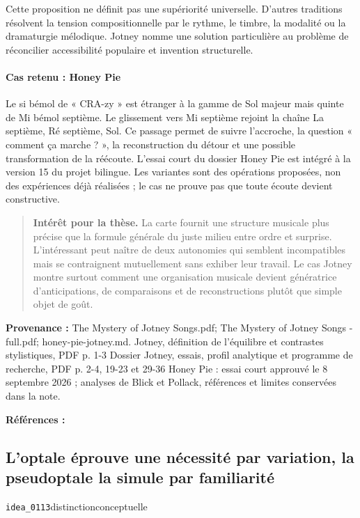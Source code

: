 \documentclass[10pt,a4paper]{article}
\begin{document}
Cette proposition ne définit pas une supériorité universelle. D'autres traditions résolvent la tension compositionnelle par le rythme, le timbre, la modalité ou la dramaturgie mélodique. Jotney nomme une solution particulière au problème de réconcilier accessibilité populaire et invention structurelle.

\paragraph{Cas retenu : Honey Pie}
Le si bémol de « CRA-zy » est étranger à la gamme de Sol majeur mais quinte de Mi bémol septième. Le glissement vers Mi septième rejoint la chaîne La septième, Ré septième, Sol. Ce passage permet de suivre l'accroche, la question « comment ça marche ? », la reconstruction du détour et une possible transformation de la réécoute. L'essai court du dossier Honey Pie est intégré à la version 15 du projet bilingue. Les variantes sont des opérations proposées, non des expériences déjà réalisées ; le cas ne prouve pas que toute écoute devient constructive.

\begin{quote}
\textbf{Intérêt pour la thèse.} La carte fournit une structure musicale plus précise que la formule générale du juste milieu entre ordre et surprise. L'intéressant peut naître de deux autonomies qui semblent incompatibles mais se contraignent mutuellement sans exhiber leur travail. Le cas Jotney montre surtout comment une organisation musicale devient génératrice d'anticipations, de comparaisons et de reconstructions plutôt que simple objet de goût.
\end{quote}
{\footnotesize\color{metadata}\textbf{Provenance :} The Mystery of Jotney Songs.pdf; The Mystery of Jotney Songs -full.pdf; honey-pie-jotney.md. Jotney, définition de l'équilibre et contrastes stylistiques, PDF p. 1-3 Dossier Jotney, essais, profil analytique et programme de recherche, PDF p. 2-4, 19-23 et 29-36 Honey Pie : essai court approuvé le 8 septembre 2026 ; analyses de Blick et Pollack, références et limites conservées dans la note.\par}
{\footnotesize\color{metadata}\textbf{Références :} \parencite{blick2013honeypie,pollack1998honeypie}\par}

\subsection{L'optale éprouve une nécessité par variation, la pseudoptale la simule par familiarité}
{\small\color{metadata} \texttt{idea\_0113}\quad\textbullet\quad distinction\quad\textbullet\quad conceptuelle\par}
\end{document}
